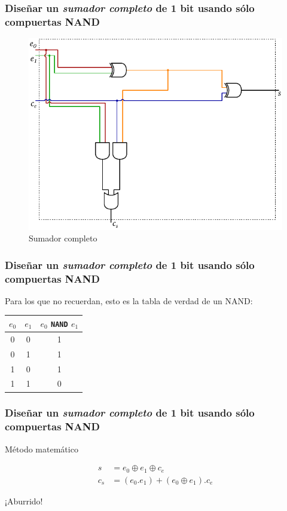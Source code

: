 \documentclass[mathserif,hyperref]{beamer}
\begin{document}
\begin{frame}
\frametitle{\small Diseñar un \textit{sumador completo} de 1 bit usando sólo
compuertas NAND}
\begin{figure}[htp]
  \caption{Sumador completo}
  \includegraphics[scale=0.7]{sumador-completo.pdf}
\end{figure}
\end{frame}


\begin{frame}
\frametitle{\small Diseñar un \textit{sumador completo} de 1 bit usando sólo
compuertas NAND}
Para los que no recuerdan, esto es la tabla de verdad de un NAND:
\begin{center}\begin{tabular}{| c | c || c |}
  \hline
  $e_0$ & $e_1$ & $e_0$ \texttt{NAND} $e_1$ \\ \hline
    0   &   0   &             1             \\
    0   &   1   &             1             \\
    1   &   0   &             1             \\
    1   &   1   &             0             \\
  \hline
\end{tabular}\end{center}
\end{frame}


\begin{frame}
\frametitle{\small Diseñar un \textit{sumador completo} de 1 bit usando sólo
compuertas NAND}
\begin{center}Método matemático\end{center}
\begin{align*}
  s   &= e_0 \oplus e_1 \oplus c_e \\
  c_s &= (e_0 . e_1) + (e_0 \oplus e_1) . c_e
\end{align*}
\pause
\begin{center}{\Large ¡Aburrido!}\end{center}
\end{frame}
\end{document}
